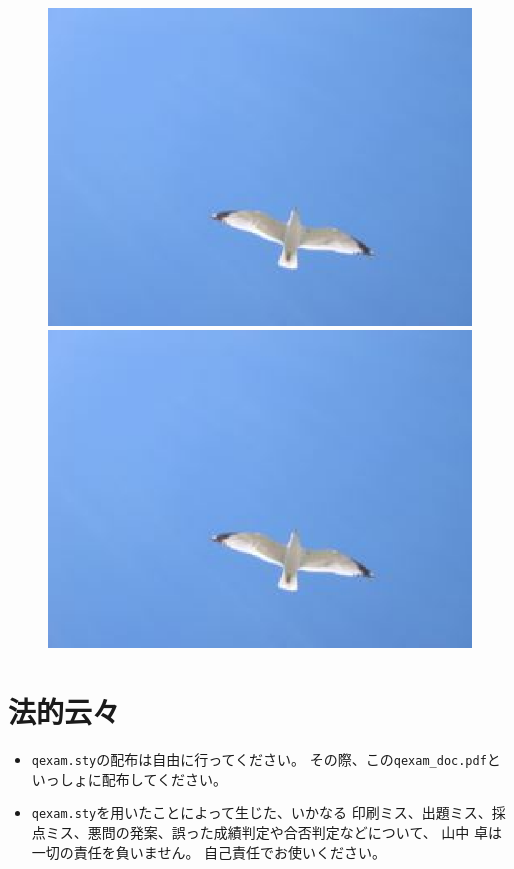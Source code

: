 \documentclass[dvipdfmx,a4j,11pt]{jarticle}
\begin{document}
		    \begin{figure}[htbp]
			\centering
		        \begin{minipage}[t]{0.45\linewidth}
		            \includegraphics[width=0.95\linewidth]{seagull2.eps}
		            \caption{}
		            \label{fig:seagull}
		        \end{minipage}
		        \hspace{0.05\linewidth}
		        \begin{minipage}[t]{0.45\linewidth}
		            \includegraphics[width=0.95\linewidth]{seagull2.eps}
		            \caption{}
		            \label{fig:seacrow}
		        \end{minipage}
		    \end{figure}

\section{法的云々}
	\begin{itemize}
		\item {\tt qexam.sty}の配布は自由に行ってください。
			その際、この{\tt qexam\_doc.pdf}といっしょに配布してください。
		\item \begin{tiny}
			{\tt qexam.sty}を用いたことによって生じた、いかなる
			印刷ミス、出題ミス、採点ミス、悪問の発案、誤った成績判定や合否判定などについて、
			山中 卓は一切の責任を負いません。
			自己責任でお使いください。
			\end{tiny}
	\end{itemize}
\end{document}
